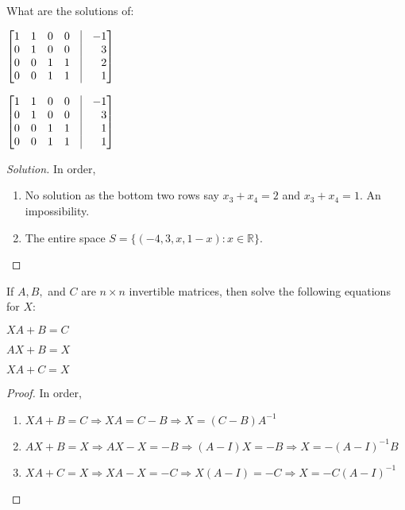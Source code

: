 \documentclass[crop=false,class=book,oneside]{standalone}
\begin{document}
\begin{problem}
What are the solutions of:
\begin{enumerate}
\begin{multicols}{2}
    \item $\begin{bmatrix*}[r] 1 & 1 & 0 & 0 & \vline & -1 \\ 0 & 1 & 0 & 0 & \vline & 3 \\ 0 & 0 & 1 & 1 & \vline & 2 \\ 0 & 0 & 1 & 1 & \vline & 1 \end{bmatrix*}$
    \item $\begin{bmatrix*}[r] 1 & 1 & 0 & 0 & \vline & -1 \\ 0 & 1 & 0 & 0 & \vline & 3 \\ 0 & 0 & 1 & 1 & \vline & 1 \\ 0 & 0 & 1 & 1 & \vline & 1 \end{bmatrix*}$
\end{multicols}
\end{enumerate}
\end{problem}
\begin{proof}[Solution]
In order,
\begin{enumerate}
    \item No solution as the bottom two rows say $x_3 + x_4 = 2$ and $x_3 + x_4 = 1$. An impossibility.
    \item The entire space $S = \{(-4,3,x,1-x):x\in \mathbb{R}\}$.
\end{enumerate}
\end{proof}
\begin{problem}
If $A,B,$ and $C$ are $n\times n$ invertible matrices, then solve the following equations for $X$:
\begin{enumerate}
\begin{multicols}{3}
    \item $XA+B=C$
    \item $AX+B=X$
    \item $XA+C=X$
\end{multicols}
\end{enumerate}
\end{problem}
\begin{proof}
In order,
\begin{enumerate}
    \item $XA +B=C\Rightarrow XA = C-B \Rightarrow X = (C-B)A^{-1}$
    \item $AX+B = X\Rightarrow AX-X=-B \Rightarrow (A-I)X=-B \Rightarrow X = -(A-I)^{-1}B$
    \item $XA+C = X \Rightarrow XA-X = -C \Rightarrow X(A-I) = -C \Rightarrow X = -C(A-I)^{-1}$
\end{enumerate}
\end{proof}
\end{document}

